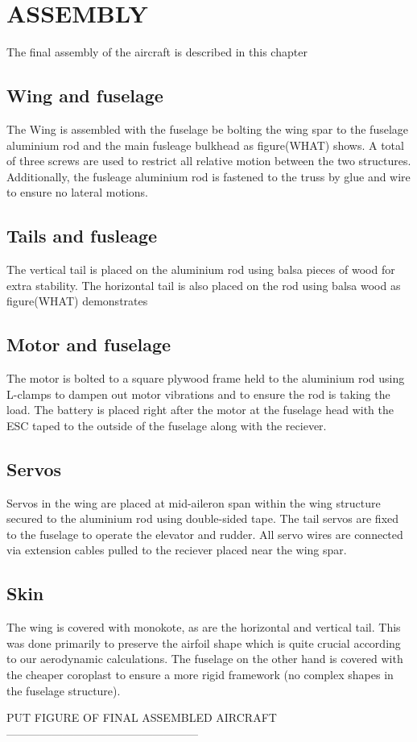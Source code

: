 \chapter{ASSEMBLY}
\label{ch5}

The final assembly of the aircraft is described in this chapter

\section{Wing and fuselage}
The Wing is assembled with the fuselage be bolting the wing spar to the fuselage aluminium rod and the main fusleage bulkhead as figure(WHAT) shows. A total of three screws are used to restrict all relative motion between the two structures. Additionally, the fusleage aluminium rod is fastened to the truss by glue and wire to ensure no lateral motions.

\section{Tails and fusleage}
The vertical tail is placed on the aluminium rod using balsa pieces of wood for extra stability. The horizontal tail is also placed on the rod using balsa wood as figure(WHAT) demonstrates

\section{Motor and fuselage}
The motor is bolted to a square plywood frame held to the aluminium rod using L-clamps to dampen out motor vibrations and to ensure the rod is taking the load. The battery is placed right after the motor at the fuselage head with the ESC taped to the outside of the fuselage along with the reciever.

\section{Servos}
Servos in the wing are placed at mid-aileron span within the wing structure secured to the aluminium rod using double-sided tape. The tail servos are fixed to the fuselage to operate the elevator and rudder. All servo wires are connected via extension cables pulled to the reciever placed near the wing spar.

\section{Skin}
The wing is covered with monokote, as are the horizontal and vertical tail. This was done primarily to preserve the airfoil shape which is quite crucial according to our aerodynamic calculations. The fuselage on the other hand is covered with the cheaper coroplast to ensure a more rigid framework (no complex shapes in the fuselage structure).

PUT FIGURE OF FINAL ASSEMBLED AIRCRAFT---------------------------------------------------
